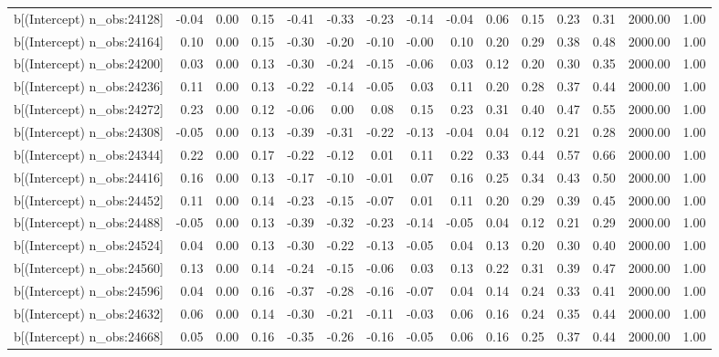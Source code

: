 \begin{table}[ht]
\begin{tabular}{rrrrrrrrrrrrrrr}
  b[(Intercept) n\_obs:24128] & -0.04 & 0.00 & 0.15 & -0.41 & -0.33 & -0.23 & -0.14 & -0.04 & 0.06 & 0.15 & 0.23 & 0.31 & 2000.00 & 1.00 \\ 
  b[(Intercept) n\_obs:24164] & 0.10 & 0.00 & 0.15 & -0.30 & -0.20 & -0.10 & -0.00 & 0.10 & 0.20 & 0.29 & 0.38 & 0.48 & 2000.00 & 1.00 \\ 
  b[(Intercept) n\_obs:24200] & 0.03 & 0.00 & 0.13 & -0.30 & -0.24 & -0.15 & -0.06 & 0.03 & 0.12 & 0.20 & 0.30 & 0.35 & 2000.00 & 1.00 \\ 
  b[(Intercept) n\_obs:24236] & 0.11 & 0.00 & 0.13 & -0.22 & -0.14 & -0.05 & 0.03 & 0.11 & 0.20 & 0.28 & 0.37 & 0.44 & 2000.00 & 1.00 \\ 
  b[(Intercept) n\_obs:24272] & 0.23 & 0.00 & 0.12 & -0.06 & 0.00 & 0.08 & 0.15 & 0.23 & 0.31 & 0.40 & 0.47 & 0.55 & 2000.00 & 1.00 \\ 
  b[(Intercept) n\_obs:24308] & -0.05 & 0.00 & 0.13 & -0.39 & -0.31 & -0.22 & -0.13 & -0.04 & 0.04 & 0.12 & 0.21 & 0.28 & 2000.00 & 1.00 \\ 
  b[(Intercept) n\_obs:24344] & 0.22 & 0.00 & 0.17 & -0.22 & -0.12 & 0.01 & 0.11 & 0.22 & 0.33 & 0.44 & 0.57 & 0.66 & 2000.00 & 1.00 \\ 
  b[(Intercept) n\_obs:24416] & 0.16 & 0.00 & 0.13 & -0.17 & -0.10 & -0.01 & 0.07 & 0.16 & 0.25 & 0.34 & 0.43 & 0.50 & 2000.00 & 1.00 \\ 
  b[(Intercept) n\_obs:24452] & 0.11 & 0.00 & 0.14 & -0.23 & -0.15 & -0.07 & 0.01 & 0.11 & 0.20 & 0.29 & 0.39 & 0.45 & 2000.00 & 1.00 \\ 
  b[(Intercept) n\_obs:24488] & -0.05 & 0.00 & 0.13 & -0.39 & -0.32 & -0.23 & -0.14 & -0.05 & 0.04 & 0.12 & 0.21 & 0.29 & 2000.00 & 1.00 \\ 
  b[(Intercept) n\_obs:24524] & 0.04 & 0.00 & 0.13 & -0.30 & -0.22 & -0.13 & -0.05 & 0.04 & 0.13 & 0.20 & 0.30 & 0.40 & 2000.00 & 1.00 \\ 
  b[(Intercept) n\_obs:24560] & 0.13 & 0.00 & 0.14 & -0.24 & -0.15 & -0.06 & 0.03 & 0.13 & 0.22 & 0.31 & 0.39 & 0.47 & 2000.00 & 1.00 \\ 
  b[(Intercept) n\_obs:24596] & 0.04 & 0.00 & 0.16 & -0.37 & -0.28 & -0.16 & -0.07 & 0.04 & 0.14 & 0.24 & 0.33 & 0.41 & 2000.00 & 1.00 \\ 
  b[(Intercept) n\_obs:24632] & 0.06 & 0.00 & 0.14 & -0.30 & -0.21 & -0.11 & -0.03 & 0.06 & 0.16 & 0.24 & 0.35 & 0.44 & 2000.00 & 1.00 \\ 
  b[(Intercept) n\_obs:24668] & 0.05 & 0.00 & 0.16 & -0.35 & -0.26 & -0.16 & -0.05 & 0.06 & 0.16 & 0.25 & 0.37 & 0.44 & 2000.00 & 1.00 \\ 

\end{tabular}
\end{table}
